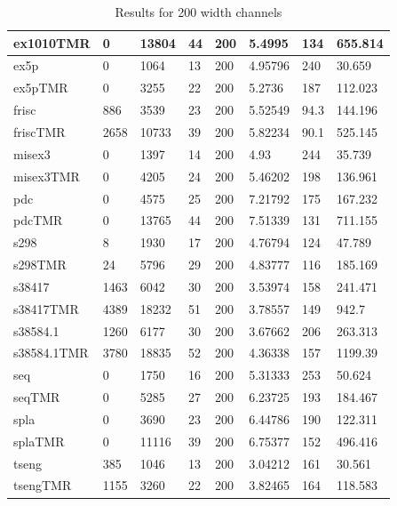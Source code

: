 \documentclass[12pt,final,oneside]{dwThesis} %
\begin{document}
\begin{table}
\begin{adjustwidth}{-1cm}{-1.2cm}
\begin{tabularx}{1.1\textwidth}{llllp{1.5cm}p{2.2cm}p{1.5cm}X}
ex1010TMR & 0 & 13804 & 44 & 200 & 5.4995 &134 & 655.814\\\midrule
ex5p & 0 & 1064 & 13 & 200 & 4.95796 &240 & 30.659\\
ex5pTMR & 0 & 3255 & 22 & 200 & 5.2736 &187 & 112.023\\\midrule
frisc & 886 & 3539 & 23 & 200 & 5.52549 &94.3 & 144.196\\
friscTMR & 2658 & 10733 & 39 & 200 & 5.82234 &90.1 & 525.145\\\midrule
misex3 & 0 & 1397 & 14 & 200 & 4.93 &244 & 35.739\\
misex3TMR & 0 & 4205 & 24 & 200 & 5.46202 &198 & 136.961\\\midrule
pdc & 0 & 4575 & 25 & 200 & 7.21792 &175 & 167.232\\
pdcTMR & 0 & 13765 & 44 & 200 & 7.51339 &131 & 711.155\\\midrule
s298 & 8 & 1930 & 17 & 200 & 4.76794 &124 & 47.789\\
s298TMR & 24 & 5796 & 29 & 200 & 4.83777 &116 & 185.169\\\midrule
s38417 & 1463 & 6042 & 30 & 200 & 3.53974 &158 & 241.471\\
s38417TMR & 4389 & 18232 & 51 & 200 & 3.78557 &149 & 942.7\\\midrule
s38584.1 & 1260 & 6177 & 30 & 200 & 3.67662 &206 & 263.313\\
s38584.1TMR & 3780 & 18835 & 52 & 200 & 4.36338 &157 & 1199.39\\\midrule
seq & 0 & 1750 & 16 & 200 & 5.31333 &253 & 50.624\\
seqTMR & 0 & 5285 & 27 & 200 & 6.23725 &193 & 184.467\\\midrule
spla & 0 & 3690 & 23 & 200 & 6.44786 &190 & 122.311\\
splaTMR & 0 & 11116 & 39 & 200 & 6.75377 &152 & 496.416\\\midrule
tseng & 385 & 1046 & 13 & 200 & 3.04212 &161 & 30.561\\
tsengTMR & 1155 & 3260 & 22 & 200 & 3.82465 &164 & 118.583\\\bottomrule
    \end{tabularx}
    \caption{Results for 200 width channels}
    \label{Results200}
\end{adjustwidth}
\end{table}
\end{document}
